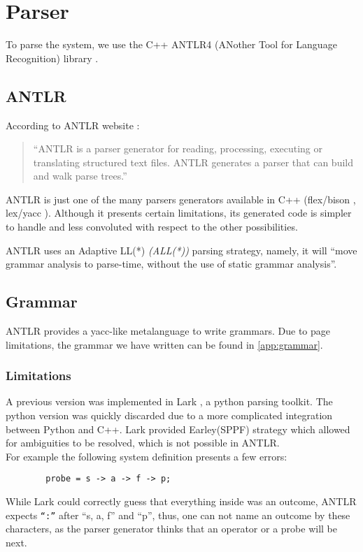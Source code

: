 \section{Parser}
        To parse the system, we use the C++ ANTLR4 (ANother Tool for Language Recognition) library \cite{antlr4}. 
        \subsection{ANTLR}
    According to ANTLR website \cite{antlr4}: 
    \begin{quote}
        ``ANTLR is a parser generator for reading, processing, executing or translating structured text files. ANTLR generates a parser that can build and walk parse trees.''
    \end{quote}

 ANTLR is just one of the many parsers generators available in C++ (flex/bison \cite{flexb}, lex/yacc \cite{lexy}). Although it presents certain limitations, its generated code is simpler to handle and less convoluted with respect to the other possibilities.

        ANTLR uses an Adaptive LL(*) \textit{(ALL(*))} parsing strategy, namely, it will ``move grammar analysis to parse-time, without the use of static grammar analysis''. \cite{antlr}

        \subsection{Grammar}
            ANTLR provides a yacc-like metalanguage \cite{antlr} to write grammars. Due to page limitations, the grammar we have written can be found in \cref{app:grammar}.
              
    \subsubsection{Limitations}
        A previous version was implemented in Lark \cite{lark}, a python parsing toolkit. The python version was quickly discarded due to a more complicated integration between Python and C++. Lark provided Earley(SPPF) strategy which allowed for ambiguities to be resolved, which is not possible in ANTLR. \\
        For example the following system definition presents a few errors:
        \begin{verbatim}
        probe = s -> a -> f -> p;
        \end{verbatim}
    While Lark could correctly guess that everything inside was an outcome, ANTLR expects \texttt{``:''} after ``s, a, f'' and ``p'', thus, one can not name an outcome by these characters, as the parser generator thinks that an operator or a probe will be next. 
